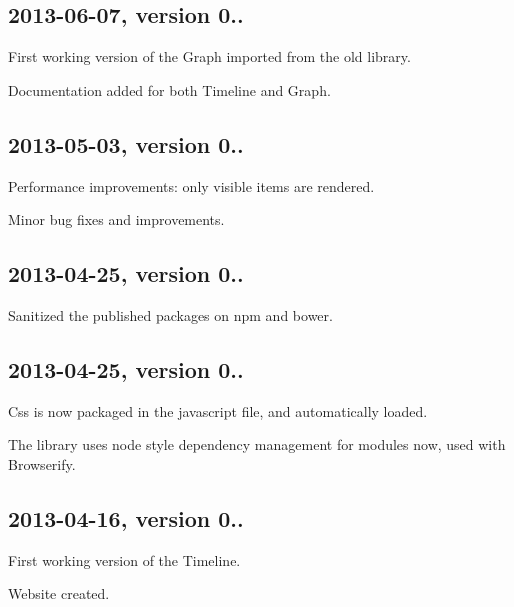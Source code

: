 \subsection*{2013-\/06-\/07, version 0..}


\begin{DoxyItemize}
\item First working version of the Graph imported from the old library.
\item Documentation added for both Timeline and Graph.
\end{DoxyItemize}

\subsection*{2013-\/05-\/03, version 0..}


\begin{DoxyItemize}
\item Performance improvements\+: only visible items are rendered.
\item Minor bug fixes and improvements.
\end{DoxyItemize}

\subsection*{2013-\/04-\/25, version 0..}


\begin{DoxyItemize}
\item Sanitized the published packages on npm and bower.
\end{DoxyItemize}

\subsection*{2013-\/04-\/25, version 0..}


\begin{DoxyItemize}
\item Css is now packaged in the javascript file, and automatically loaded.
\item The library uses node style dependency management for modules now, used with Browserify.
\end{DoxyItemize}

\subsection*{2013-\/04-\/16, version 0..}


\begin{DoxyItemize}
\item First working version of the Timeline.
\item Website created. 
\end{DoxyItemize}